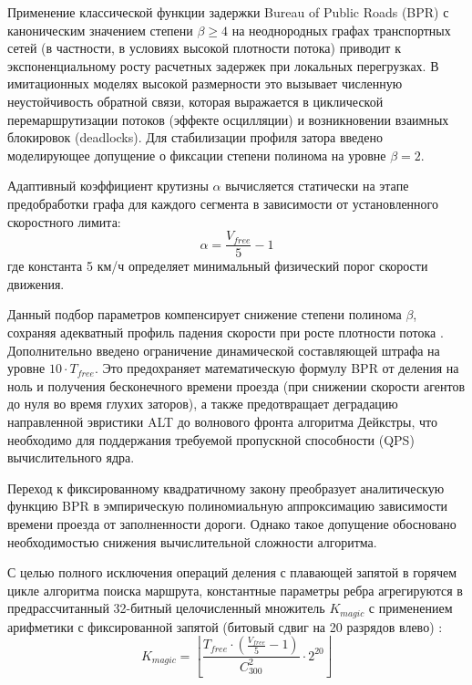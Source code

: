 Применение классической функции задержки Bureau of Public Roads (BPR) \cite{sheffi1985urban, gore2023modified} с каноническим значением степени $\beta \ge 4$ на неоднородных графах транспортных сетей (в частности, в условиях высокой плотности потока) приводит к экспоненциальному росту расчетных задержек при локальных перегрузках. В имитационных моделях высокой размерности это вызывает численную неустойчивость обратной связи, которая выражается в циклической перемаршрутизации потоков (эффекте осцилляции) и возникновении взаимных блокировок (deadlocks). Для стабилизации профиля затора введено моделирующее допущение о фиксации степени полинома на уровне $\beta = 2$.

Адаптивный коэффициент крутизны $\alpha$ вычисляется статически на этапе предобработки графа для каждого сегмента в зависимости от установленного скоростного лимита:
\begin{equation}
    \alpha = \frac{V_{free}}{5} - 1
\end{equation}
где константа 5 км/ч определяет минимальный физический порог скорости движения.

Данный подбор параметров компенсирует снижение степени полинома $\beta$, сохраняя адекватный профиль падения скорости при росте плотности потока \cite{gore2023modified}. Дополнительно введено ограничение динамической составляющей штрафа на уровне $10 \cdot T_{free}$. Это предохраняет математическую формулу BPR от деления на ноль и получения бесконечного времени проезда (при снижении скорости агентов до нуля во время глухих заторов), а также предотвращает деградацию направленной эвристики ALT до волнового фронта алгоритма Дейкстры, что необходимо для поддержания требуемой пропускной способности (QPS) вычислительного ядра.

Переход к фиксированному квадратичному закону преобразует аналитическую функцию BPR в эмпирическую полиномиальную аппроксимацию зависимости времени проезда от заполненности дороги. Однако такое допущение обосновано необходимостью снижения вычислительной сложности алгоритма.

С целью полного исключения операций деления с плавающей запятой в горячем цикле алгоритма поиска маршрута, константные параметры ребра агрегируются в предрассчитанный 32-битный целочисленный множитель $K_{magic}$ с применением арифметики с фиксированной запятой (битовый сдвиг на 20 разрядов влево) \cite{butorin2026thread}:
\begin{equation}
    K_{magic} = \left\lfloor \frac{T_{free} \cdot \left( \frac{V_{free}}{5} - 1 \right)}{C_{300}^2} \cdot 2^{20} \right\rfloor
\end{equation}

